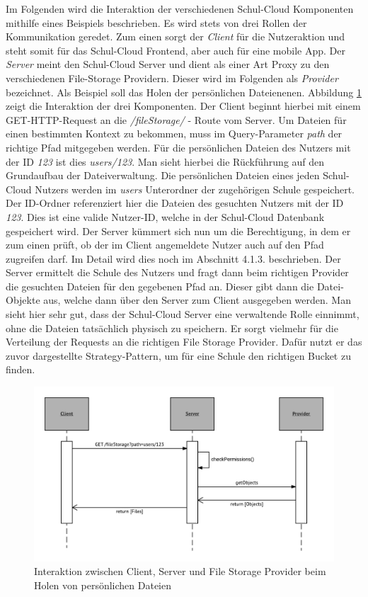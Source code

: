 
Im Folgenden wird die Interaktion der verschiedenen Schul-Cloud Komponenten mithilfe eines Beispiels beschrieben. Es wird stets von drei Rollen der Kommunikation geredet. Zum einen sorgt der \textit{Client} für die Nutzeraktion und steht somit für das Schul-Cloud Frontend, aber auch für eine mobile App. Der \textit{Server} meint den Schul-Cloud Server und dient als einer Art Proxy zu den verschiedenen File-Storage Providern. Dieser wird im Folgenden als \textit{Provider} bezeichnet. Als Beispiel soll das Holen der persönlichen Dateienenen. Abbildung \ref{fig:interacton_getFiles} zeigt die Interaktion der drei Komponenten. Der Client beginnt hierbei mit einem GET-HTTP-Request an die \textit{/fileStorage/} - Route vom Server. Um Dateien für einen bestimmten Kontext zu bekommen, muss im Query-Parameter \textit{path} der richtige Pfad mitgegeben werden. Für die persönlichen Dateien des Nutzers mit der ID \textit{123} ist dies \textit{users/123}. Man sieht hierbei die Rückführung auf den Grundaufbau der Dateiverwaltung. Die persönlichen Dateien eines jeden Schul-Cloud Nutzers werden im \textit{users} Unterordner der zugehörigen Schule gespeichert. Der ID-Ordner referenziert hier die Dateien des gesuchten Nutzers mit der ID \textit{123}. Dies ist eine valide Nutzer-ID, welche in der Schul-Cloud Datenbank gespeichert wird. Der Server kümmert sich nun um die Berechtigung, in dem er zum einen prüft, ob der im Client angemeldete Nutzer auch auf den Pfad zugreifen darf. Im Detail wird dies noch im Abschnitt 4.1.3. beschrieben. Der Server ermittelt die Schule des Nutzers und fragt dann beim richtigen Provider die gesuchten Dateien für den gegebenen Pfad an. Dieser gibt dann die Datei-Objekte aus, welche dann über den Server zum Client ausgegeben werden. Man sieht hier sehr gut, dass der Schul-Cloud Server eine verwaltende Rolle einnimmt, ohne die Dateien tatsächlich physisch zu speichern. Er sorgt vielmehr für die Verteilung der Requests an die richtigen File Storage Provider. Dafür nutzt er das zuvor dargestellte Strategy-Pattern, um für eine Schule den richtigen Bucket zu finden.

\begin{figure}[H]
	\centering
	\includegraphics[width=1\linewidth]{images/fileumlsequence}
	\caption[Caption for concept]{Interaktion zwischen Client, Server und File Storage Provider  beim Holen von persönlichen Dateien}
	\label{fig:interacton_getFiles}
\end{figure}

